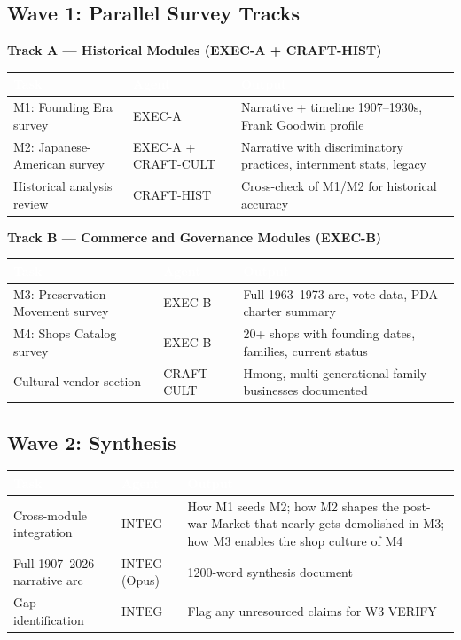 \documentclass[11pt,letterpaper]{article}
\newcommand{\tableheader}[1]{\textbf{\sffamily\textcolor{white}{#1}}}
\begin{document}
\subsection{Wave 1: Parallel Survey Tracks}

\textbf{Track A --- Historical Modules (EXEC-A + CRAFT-HIST)}

\begin{center}
\begin{tabularx}{\textwidth}{L{3cm}L{2.5cm}X}
\toprule
{}
\tableheader{Task} & \tableheader{Agent} & \tableheader{Output} \\
\midrule
M1: Founding Era survey & EXEC-A & Narrative + timeline 1907--1930s, Frank Goodwin profile \\
M2: Japanese-American survey & EXEC-A + CRAFT-CULT & Narrative with discriminatory practices, internment stats, legacy \\
Historical analysis review & CRAFT-HIST & Cross-check of M1/M2 for historical accuracy \\
\bottomrule
\end{tabularx}
\end{center}

\textbf{Track B --- Commerce and Governance Modules (EXEC-B)}

\begin{center}
\begin{tabularx}{\textwidth}{L{3cm}L{2.5cm}X}
\toprule
{}
\tableheader{Task} & \tableheader{Agent} & \tableheader{Output} \\
\midrule
M3: Preservation Movement survey & EXEC-B & Full 1963--1973 arc, vote data, PDA charter summary \\
M4: Shops Catalog survey & EXEC-B & 20+ shops with founding dates, families, current status \\
Cultural vendor section & CRAFT-CULT & Hmong, multi-generational family businesses documented \\
\bottomrule
\end{tabularx}
\end{center}

\subsection{Wave 2: Synthesis}

\begin{center}
\begin{tabularx}{\textwidth}{L{3cm}L{2.5cm}X}
\toprule
{}
\tableheader{Task} & \tableheader{Agent} & \tableheader{Output} \\
\midrule
Cross-module integration & INTEG & How M1 seeds M2; how M2 shapes the post-war Market that nearly gets demolished in M3; how M3 enables the shop culture of M4 \\
Full 1907--2026 narrative arc & INTEG (Opus) & 1200-word synthesis document \\
Gap identification & INTEG & Flag any unresourced claims for W3 VERIFY \\
\bottomrule
\end{tabularx}
\end{center}
\end{document}
